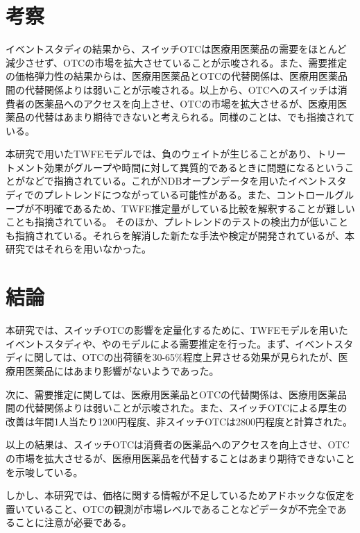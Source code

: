 \documentclass[a4paper,11pt,uplatex]{jsarticle}
\theoremstyle{definition}
\begin{document}
\section{考察}
イベントスタディの結果から、スイッチOTCは医療用医薬品の需要をほとんど減少させず、OTCの市場を拡大させていることが示唆される。また、需要推定の価格弾力性の結果からは、医療用医薬品とOTCの代替関係は、医療用医薬品間の代替関係よりは弱いことが示唆される。以上から、OTCへのスイッチは消費者の医薬品へのアクセスを向上させ、OTCの市場を拡大させるが、医療用医薬品の代替はあまり期待できないと考えられる。同様のことは、\cite{Stomberg2013}でも指摘されている。

本研究で用いたTWFEモデルでは、負のウェイトが生じることがあり、トリートメント効果がグループや時間に対して異質的であるときに問題になるということが\cite{ROTH2023}などで指摘されている。これがNDBオープンデータを用いたイベントスタディでのプレトレンドにつながっている可能性がある。また、コントロールグループが不明確であるため、TWFE推定量がしている比較を解釈することが難しいことも指摘されている。
そのほか、プレトレンドのテストの検出力が低いことも指摘されている。それらを解消した新たな手法や検定が開発されているが、本研究ではそれらを用いなかった。
\section{結論}
本研究では、スイッチOTCの影響を定量化するために、TWFEモデルを用いたイベントスタディや、\cite{Berry1994}や\cite{BLP}のモデルによる需要推定を行った。まず、イベントスタディに関しては、OTCの出荷額を30-65\%程度上昇させる効果が見られたが、医療用医薬品にはあまり影響がないようであった。

次に、需要推定に関しては、医療用医薬品とOTCの代替関係は、医療用医薬品間の代替関係よりは弱いことが示唆された。また、スイッチOTCによる厚生の改善は年間1人当たり1200円程度、非スイッチOTCは2800円程度と計算された。

以上の結果は、スイッチOTCは消費者の医薬品へのアクセスを向上させ、OTCの市場を拡大させるが、医療用医薬品を代替することはあまり期待できないことを示唆している。

しかし、本研究では、価格に関する情報が不足しているためアドホックな仮定を置いていること、OTCの観測が市場レベルであることなどデータが不完全であることに注意が必要である。

\end{document}
